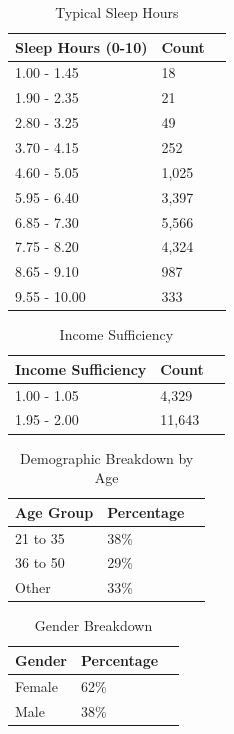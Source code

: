 \documentclass[runningheads]{llncs}
\begin{document}
\begin{enumerate}
\begin{table}[ht]
    \centering
    \caption{Typical Sleep Hours}\label{tab1}
    \begin{tabular}{|l|l|l|}
        \hline
        \textbf{Sleep Hours (0-10)} & \textbf{Count} \\ 
        \hline
        1.00 - 1.45 & 18 \\ 
        1.90 - 2.35 & 21 \\ 
        2.80 - 3.25 & 49 \\ 
        3.70 - 4.15 & 252 \\ 
        4.60 - 5.05 & 1,025 \\ 
        5.95 - 6.40 & 3,397 \\ 
        6.85 - 7.30 & 5,566 \\ 
        7.75 - 8.20 & 4,324 \\ 
        8.65 - 9.10 & 987 \\ 
        9.55 - 10.00 & 333 \\ 
        \hline
    \end{tabular}
\end{table}

\begin{table}
    \centering
    \caption{Income Sufficiency}\label{tab1}
    \begin{tabular}{|l|l|l|}
        \hline
        \textbf{Income Sufficiency} & \textbf{Count} \\ 
        \hline
        1.00 - 1.05 & 4,329 \\ 
        1.95 - 2.00 & 11,643 \\ 
        \hline
    \end{tabular}

\end{table}


\begin{table}[ht]
    \centering
    \caption{Demographic Breakdown by Age}\label{tab1}
    \begin{tabular}{|l|l|l|}
        \hline
        \textbf{Age Group} & \textbf{Percentage} \\ 
        \hline
        21 to 35 & 38\% \\ 
        36 to 50 & 29\% \\ 
        Other & 33\% \\ 
        \hline
    \end{tabular}
\end{table}
\clearpage

\begin{table}[h]
    \centering
    \caption{Gender Breakdown}\label{tab1}
    \begin{tabular}{|l|l|l|}
        \hline
        \textbf{Gender} & \textbf{Percentage} \\ 
        \hline
        Female & 62\% \\ 
        Male & 38\% \\ 
        \hline
    \end{tabular}
\end{table}


\end{enumerate}
\end{document}
